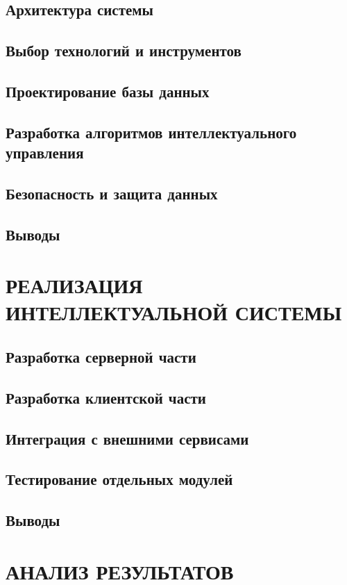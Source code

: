 \documentclass[14pt]{article}
\begin{document}
\subsection{Архитектура системы}
\subsection{Выбор технологий и инструментов}
\subsection{Проектирование базы данных}
\subsection{Разработка алгоритмов интеллектуального управления}
\subsection{Безопасность и защита данных}
\subsection{Выводы}

\newpage
\section{РЕАЛИЗАЦИЯ ИНТЕЛЛЕКТУАЛЬНОЙ СИСТЕМЫ}
\subsection{Разработка серверной части}
\subsection{Разработка клиентской части}
\subsection{Интеграция с внешними сервисами}
\subsection{Тестирование отдельных модулей}
\subsection{Выводы}

\newpage
\section{АНАЛИЗ РЕЗУЛЬТАТОВ}
\end{document}
